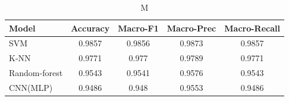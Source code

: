 \begin{table}[h!]
\centering
\caption{M}
\begin{tabular}{lcccc}
\toprule
\textbf{Model} & \textbf{Accuracy} & \textbf{Macro-F1} & \textbf{Macro-Prec} & \textbf{Macro-Recall} \\
\midrule
SVM&0.9857&0.9856&0.9873&0.9857\\ 
K-NN&0.9771&0.977&0.9789&0.9771\\ 
Random-forest&0.9543&0.9541&0.9576&0.9543\\ 
CNN(MLP)&0.9486&0.948&0.9553&0.9486\\ 
\bottomrule
\end{tabular}
\label{tab:M}
\end{table}
